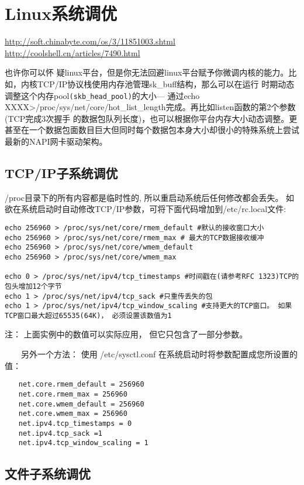 \section{Linux系统调优}
\url{http://soft.chinabyte.com/os/3/11851003.shtml}
\url{http://coolshell.cn/articles/7490.html}


也许你可以怀 疑linux平台，但是你无法回避linux平台赋予你微调内核的能力。比如，内核TCP/IP协议栈使用内存池管理sk\_buff结构，那么可以在运行 时期动态调整这个内存pool\verb$(skb_head_pool)$的大小--- 通过echo XXXX>/proc/sys/net/core/hot\_list\_length完成。再比如listen函数的第2个参数(TCP完成3次握手 的数据包队列长度)，也可以根据你平台内存大小动态调整。更甚至在一个数据包面数目巨大但同时每个数据包本身大小却很小的特殊系统上尝试最新的NAPI网卡驱动架构。

\subsection{TCP/IP子系统调优}
/proc目录下的所有内容都是临时性的, 所以重启动系统后任何修改都会丢失。
如欲在系统启动时自动修改TCP/IP参数，可将下面代码增加到/etc/rc.local文件: 

\begin{verbatim}
echo 256960 > /proc/sys/net/core/rmem_default #默认的接收窗口大小
echo 256960 > /proc/sys/net/core/rmem_max # 最大的TCP数据接收缓冲
echo 256960 > /proc/sys/net/core/wmem_default
echo 256960 > /proc/sys/net/core/wmem_max

echo 0 > /proc/sys/net/ipv4/tcp_timestamps #时间戳在(请参考RFC 1323)TCP的包头增加12个字节
echo 1 > /proc/sys/net/ipv4/tcp_sack #只重传丢失的包
echo 1 > /proc/sys/net/ipv4/tcp_window_scaling #支持更大的TCP窗口。 如果TCP窗口最大超过65535(64K)， 必须设置该数值为1
\end{verbatim}
注： 上面实例中的数值可以实际应用， 但它只包含了一部分参数。

　　另外一个方法： 使用 /etc/sysctl.conf 在系统启动时将参数配置成您所设置的值：
\begin{verbatim}
　　net.core.rmem_default = 256960
　　net.core.rmem_max = 256960
　　net.core.wmem_default = 256960
　　net.core.wmem_max = 256960
　　net.ipv4.tcp_timestamps = 0
　　net.ipv4.tcp_sack =1
　　net.ipv4.tcp_window_scaling = 1
\end{verbatim}


 
 \subsection{文件子系统调优}
